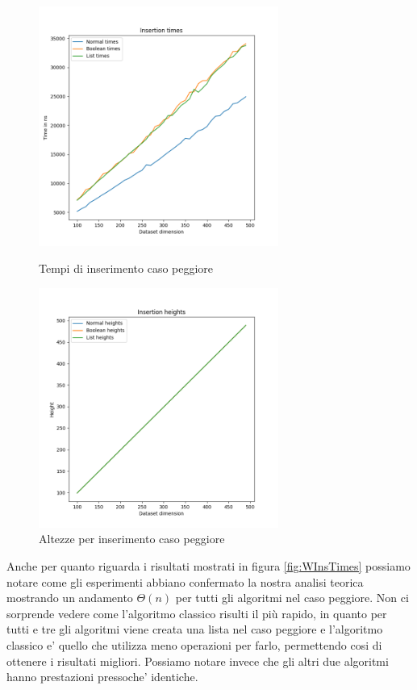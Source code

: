 \begin{figure}[H]
  \centering
  \begin{minipage}{.5\textwidth}
    \centering
    \includegraphics[width=0.7\textwidth]{Resources/ABR_Resources/WorstInsertionTimes.png}
    \caption{Tempi di inserimento caso peggiore}
    \label{fig:WInsTimes}
  \end{minipage}%
  \hfil %
  \begin{minipage}{.5\textwidth}
    \centering
    \includegraphics[width=0.7\textwidth]{Resources/ABR_Resources/WorstInsertionHeights.png}
    \caption{Altezze per inserimento caso peggiore}
    \label{fig:WInsHeights}
  \end{minipage}%
\end{figure}

Anche per quanto riguarda i risultati mostrati in figura \ref{fig:WInsTimes} possiamo notare come gli esperimenti abbiano confermato la nostra analisi teorica mostrando un andamento $\Theta(n)$ per tutti
gli algoritmi nel caso peggiore. Non ci sorprende vedere come l'algoritmo classico risulti il più rapido, in quanto per tutti e tre gli algoritmi viene creata una lista nel caso peggiore e l'algoritmo
classico e' quello che utilizza meno operazioni per farlo, permettendo cosi di ottenere i risultati migliori.
Possiamo notare invece che gli altri due algoritmi hanno prestazioni pressoche' identiche.

